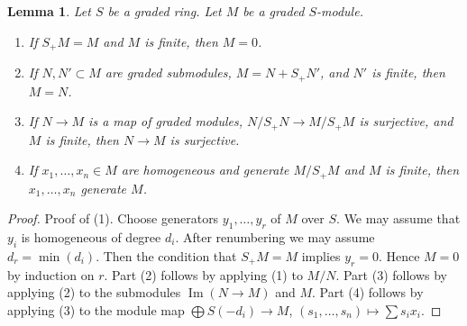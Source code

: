 \documentclass[10pt,a4paper]{amsart}
\theoremstyle{plain}
\newtheorem{lemma}[subsection]{Lemma}
\theoremstyle{definition}
\theoremstyle{remark}
\numberwithin{equation}{subsection}
\def\Im{\mathop{\mathrm{Im}}}
\begin{document}
\begin{lemma}
\label{lemma-graded-NAK}
Let $S$ be a graded ring. Let $M$ be a graded $S$-module.
\begin{enumerate}
\item If $S_+M = M$ and $M$ is finite, then $M = 0$.
\item If $N, N' \subset M$ are graded submodules,
$M = N + S_+N'$, and $N'$ is finite, then $M = N$.
\item If $N \to M$ is a map of graded modules, $N/S_+N \to M/S_+M$
is surjective, and $M$ is finite, then $N \to M$ is surjective.
\item If $x_1, \ldots, x_n \in M$ are homogeneous and generate $M/S_+M$
and $M$ is finite, then $x_1, \ldots, x_n$ generate $M$.
\end{enumerate}
\end{lemma}

\begin{proof}
Proof of (1). Choose generators $y_1, \ldots, y_r$ of $M$ over $S$.
We may assume that $y_i$ is homogeneous of degree $d_i$. After
renumbering we may assume $d_r = \min(d_i)$. Then the condition that
$S_+M = M$ implies $y_r = 0$. Hence $M = 0$ by induction on $r$.
Part (2) follows by applying (1) to $M/N$. Part (3) follows by
applying (2) to the submodules $\Im(N \to M)$ and $M$.
Part (4) follows by applying (3) to the module map
$\bigoplus S(-d_i) \to M$, $(s_1, \ldots, s_n) \mapsto \sum s_i x_i$.
\end{proof}
\end{document}

